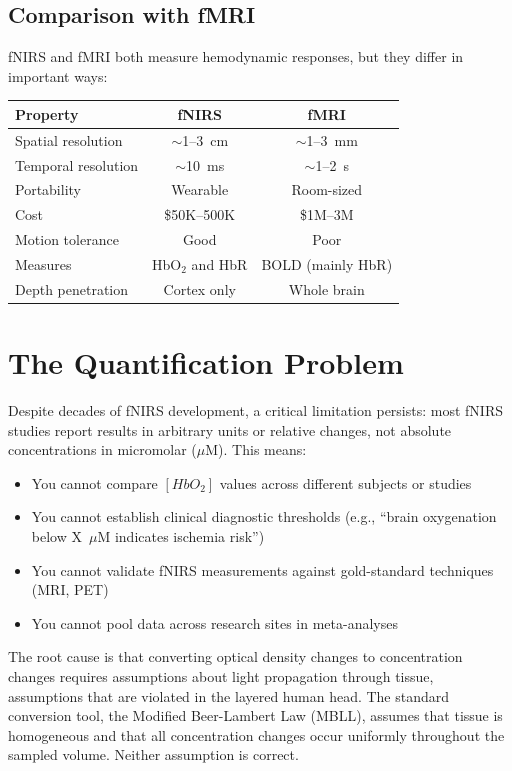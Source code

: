 \documentclass[12pt]{article}
\def\text#1{#1}%
\begin{document}
\subsection{Comparison with fMRI}

fNIRS and fMRI both measure hemodynamic responses, but they differ in important ways:

\begin{center}
\begin{tabular}{lcc}
\hline
\textbf{Property} & \textbf{fNIRS} & \textbf{fMRI} \\
\hline
Spatial resolution & $\sim$1--3~cm & $\sim$1--3~mm \\
Temporal resolution & $\sim$10~ms & $\sim$1--2~s \\
Portability & Wearable & Room-sized \\
Cost & \$50K--500K & \$1M--3M \\
Motion tolerance & Good & Poor \\
Measures & HbO$_2$ and HbR & BOLD (mainly HbR) \\
Depth penetration & Cortex only & Whole brain \\
\hline
\end{tabular}
\end{center}

\section{The Quantification Problem}

Despite decades of fNIRS development, a critical limitation persists: most fNIRS studies report results in arbitrary units or relative changes, not absolute concentrations in micromolar ($\mu$M). This means:

\begin{itemize}
\item You cannot compare $[\text{HbO}_2]$ values across different subjects or studies
\item You cannot establish clinical diagnostic thresholds (e.g., ``brain oxygenation below X~$\mu$M indicates ischemia risk'')
\item You cannot validate fNIRS measurements against gold-standard techniques (MRI, PET)
\item You cannot pool data across research sites in meta-analyses
\end{itemize}

The root cause is that converting optical density changes to concentration changes requires assumptions about light propagation through tissue, assumptions that are violated in the layered human head. The standard conversion tool, the Modified Beer-Lambert Law (MBLL), assumes that tissue is homogeneous and that all concentration changes occur uniformly throughout the sampled volume. Neither assumption is correct.
\end{document}
